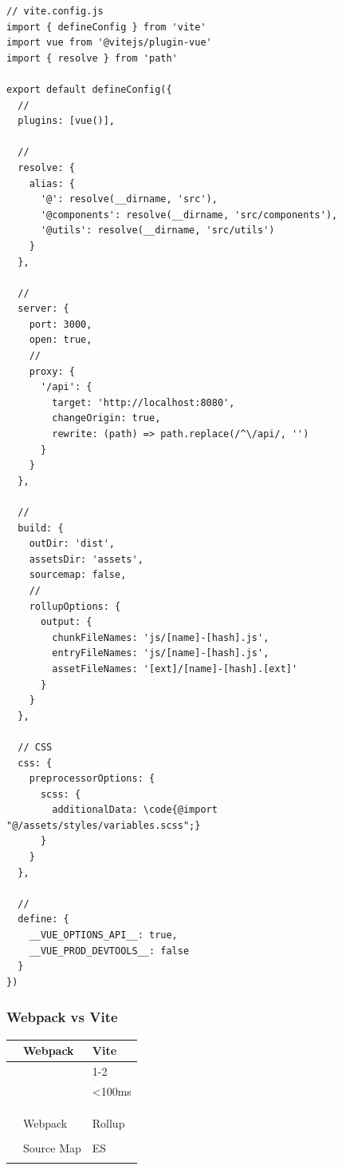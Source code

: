 \begin{lstlisting}[style=javascript]
// vite.config.js
import { defineConfig } from 'vite'
import vue from '@vitejs/plugin-vue'
import { resolve } from 'path'

export default defineConfig({
  // 
  plugins: [vue()],
  
  // 
  resolve: {
    alias: {
      '@': resolve(__dirname, 'src'),
      '@components': resolve(__dirname, 'src/components'),
      '@utils': resolve(__dirname, 'src/utils')
    }
  },
  
  // 
  server: {
    port: 3000,
    open: true,
    // 
    proxy: {
      '/api': {
        target: 'http://localhost:8080',
        changeOrigin: true,
        rewrite: (path) => path.replace(/^\/api/, '')
      }
    }
  },
  
  // 
  build: {
    outDir: 'dist',
    assetsDir: 'assets',
    sourcemap: false,
    // 
    rollupOptions: {
      output: {
        chunkFileNames: 'js/[name]-[hash].js',
        entryFileNames: 'js/[name]-[hash].js',
        assetFileNames: '[ext]/[name]-[hash].[ext]'
      }
    }
  },
  
  // CSS
  css: {
    preprocessorOptions: {
      scss: {
        additionalData: \code{@import "@/assets/styles/variables.scss";}
      }
    }
  },
  
  // 
  define: {
    __VUE_OPTIONS_API__: true,
    __VUE_PROD_DEVTOOLS__: false
  }
})
\end{lstlisting}

\hypertarget{webpack-vs-vite}{%
\subsubsection{Webpack vs Vite}\label{webpack-vs-vite}}

\begin{longtable}[]{@{}lll@{}}
\toprule\noalign{}
& Webpack & Vite \\
\midrule\noalign{}
\endhead
\bottomrule\noalign{}
\endlastfoot
\important{} & & 1-2 \\
\important{} & & \textless100ms \\
\important{} & & \\
\important{} & & \\
\important{} & & \\
\important{} & Webpack & Rollup \\
\important{} & & \\
\important{} & Source Map & ES \\
\important{} & & \\
\end{longtable}

